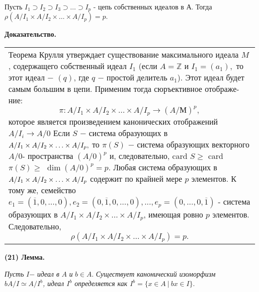 \documentclass{mai_book}
\begin{document}
	
	Пусть $I_{1} \supset I_{2} \supset I_{3} \supset \ldots \supset I_{p}$ - цепь собственных идеалов в А. Тогда \linebreak
	$\rho(A/I_{1} \times A/I_{2} \times \ldots \times A/I_{p}) = p.$ %
	
	\noindent
	{\bf Доказательство.}
	
	\begin{tabular}{|p{12.5cm}}
	\noindent
	Теорема Крулля утверждает существование максимального идеала\linebreak
	$M$, содержащего собственный идеал $I_{1}$ (если $A = \mathbb Z$ и $I_{1} = (a_{1}),$ то\linebreak
	этот идеал $-$ $(q)$, где $q$ $-$ простой делитель $a_{1}$). Этот идеал будет\linebreak
	самым большим в цепи. Применим тогда сюръективное отображе-\linebreak
	ние:
	$$\pi : A/I_{1} \times A/I_{2} \times \ldots \times A/I_{p} \longrightarrow (A/М)^{p},$$
	которое является произведением канонических отображений\linebreak
	$A/I_{i} \rightarrow A/0$ Если $S$ $-$ система образующих в $A/I_{1} \times A/I_{2} \times \linebreak
	\ldots \times A/I_{p},$ то $\pi(S)$ $-$ система образующих векторного $A/0$-\linebreak
	пространства $(A/0)^{p}$ и, следовательно, card $S \geqslant $ card $\pi (S) \geqslant$\linebreak
	$\dim(A/0)^{p} = p. $ Любая система образующих в  $A/I_{1} \times A/I_{2} \times \ldots \times \linebreak
	A/I_{p}$ содержит по крайней мере $p$ элементов. К тому же, семейство \linebreak
	$e_{1} =  (\overline{1}, 0, \ldots, 0), e_{2} = (0, \overline{1}, 0, \ldots, 0), \ldots, e_{p} = (0, \ldots, 0, \overline{1})$ - система \linebreak
	образующих в $A/I_{1} \times A/I_{2} \times \ldots \times A/I_{p}$, имеющая ровно $p$ элементов.\linebreak
	Следовательно,
	$$\rho (A/I_{1} \times A/I_{2} \times \ldots \times A/I_{p}) = p. $$
	\end{tabular}
	
	\noindent
	{\bf(21) Лемма.}
	
	{\it Пусть} $I${\it $-$ идеал в} $A$ {\it и} $b \in A.$ {\it Существует канонический изоморфизм\linebreak
	$bA/I\simeq A/I^{b}$, идеал $I^{b}$ определяется как $I^{b} = \{ x \in A \ | \ bx \in I\} .$}
	
\end{document}

